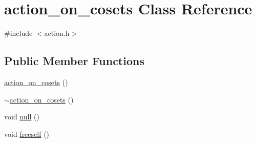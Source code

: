 \hypertarget{classaction__on__cosets}{}\section{action\+\_\+on\+\_\+cosets Class Reference}
\label{classaction__on__cosets}


{\ttfamily \#include $<$action.\+h$>$}

\subsection*{Public Member Functions}
\begin{DoxyCompactItemize}
\item 
\mbox{\hyperlink{classaction__on__cosets_a0c4c943b7077711319ad40197841a627}{action\+\_\+on\+\_\+cosets}} ()
\item 
\mbox{\hyperlink{classaction__on__cosets_a6d54f766c814b593efa6d086581df56e}{$\sim$action\+\_\+on\+\_\+cosets}} ()
\item 
void \mbox{\hyperlink{classaction__on__cosets_a8c475128972507cfccef674332ee9942}{null}} ()
\item 
void \mbox{\hyperlink{classaction__on__cosets_a6a02c260572535d8e49d4fafedcae303}{freeself}} ()
\item 

\end{DoxyCompactItemize}
